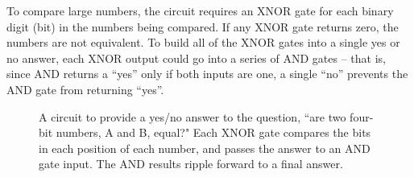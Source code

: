 To compare large numbers, the circuit requires an XNOR gate for each binary digit (bit) in the numbers being compared. If any XNOR gate returns zero, the numbers are not equivalent. To build all of the XNOR gates into a single yes or no answer, each XNOR output could go into a series of AND gates -- that is, since AND returns a ``yes'' only if both inputs are one, a single ``no'' prevents the AND gate from returning ``yes''. 


\begin{figure}[h!]
\begin{center}

\caption{A circuit to provide a yes/no answer to the question, ``are  two four-bit numbers, A and B, equal?" Each XNOR gate compares the bits in each position of each number, and passes the answer to an AND gate input. The AND results ripple forward to a final answer.}
\end{center}
\end{figure}



\clearpage


